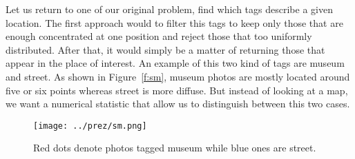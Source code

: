 Let us return to one of our original problem, find which tags describe a given
location. The first approach would to filter this  tags to keep
only those that are enough concentrated at one position and reject those that
too uniformly distributed. After that, it would simply be a matter of
returning those that appear in the place of interest. An example of this two
kind of tags are \textsf{museum} and \textsf{street}. As shown in
Figure~\vref{f:sm}, \textsf{museum} photos are mostly located around five or
six points whereas \textsf{street} is more diffuse. But instead of looking at
a map, we want a numerical statistic that allow us to distinguish between this
two cases.

\begin{figure}[hbtp]
	\centering
	\texttt{[image: ../prez/sm.png]}
	\caption{Red dots denote photos tagged \textsf{museum} while blue ones are
	\textsf{street}.\label{f:sm}}
\end{figure}
